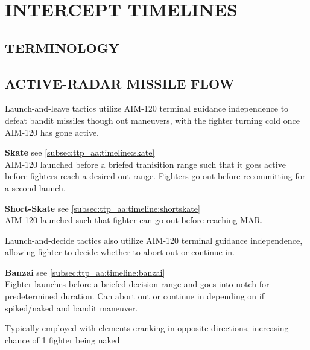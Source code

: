 \section{INTERCEPT TIMELINES}
\label{sec:ttp_aa:timelines}

\subsection{TERMINOLOGY}

\begin{tcoloritemize}
    \blueitem[Contact]
    \blueitem[Group]
    \blueitem[Picture]
\end{tcoloritemize}

\subsection[AR FLOW]{ACTIVE-RADAR MISSILE FLOW}

\begin{tcoloritemize}
    Launch-and-leave tactics utilize AIM-120 terminal guidance independence 
    to defeat bandit missiles though out maneuvers, 
    with the fighter turning cold once AIM-120 has gone active.

    \bigskip
    \textbf{Skate} \hfill see \cref{subsec:ttp_aa:timeline:skate}\\
    AIM-120 launched before a briefed tranisition range 
    such that it goes active before fighters reach a desired out range.
    Fighters go out before recommitting for a second launch.
    
    \bigskip
    \textbf{Short-Skate} \hfill see \cref{subsec:ttp_aa:timeline:shortskate}\\
    AIM-120 launched such that fighter can go out before reaching MAR.

    Launch-and-decide tactics also utilize AIM-120 terminal guidance independence, 
    allowing fighter to decide whether to abort out or continue in.

    \bigskip
    \textbf{Banzai} \hfill see \cref{subsec:ttp_aa:timeline:banzai}\\
    Fighter launches before a briefed decision range and goes into notch for predetermined duration. 
    Can abort out or continue in depending on if spiked/naked and bandit maneuver.

    Typically employed with elements cranking in opposite directions, increasing chance of 1 fighter being naked
\end{tcoloritemize}


